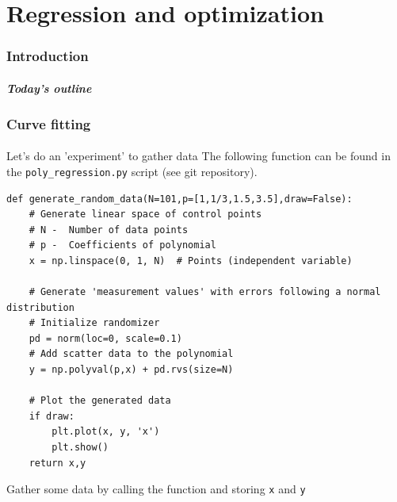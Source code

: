 \part{Regression and optimization}
\section{Introduction}
\subsection*{}
\begin{frame}[label=contents_opt]
  \frametitle{Today's outline}
\end{frame}


\section{Curve fitting}
\subsection*{}
\begin{frame}[fragile,label={slidedatacreate}]{Let's do an 'experiment' to gather data}
The following function can be found in the \lstinline|poly_regression.py| script (see git repository).
    \begin{lstlisting}
def generate_random_data(N=101,p=[1,1/3,1.5,3.5],draw=False):
    # Generate linear space of control points
    # N -  Number of data points
    # p -  Coefficients of polynomial
    x = np.linspace(0, 1, N)  # Points (independent variable)

    # Generate 'measurement values' with errors following a normal distribution
    # Initialize randomizer
    pd = norm(loc=0, scale=0.1)
    # Add scatter data to the polynomial
    y = np.polyval(p,x) + pd.rvs(size=N)

    # Plot the generated data
    if draw:
        plt.plot(x, y, 'x')
        plt.show()      
    return x,y   
    \end{lstlisting}
    Gather some data by calling the function and storing \lstinline|x| and \lstinline|y|
\end{frame}


